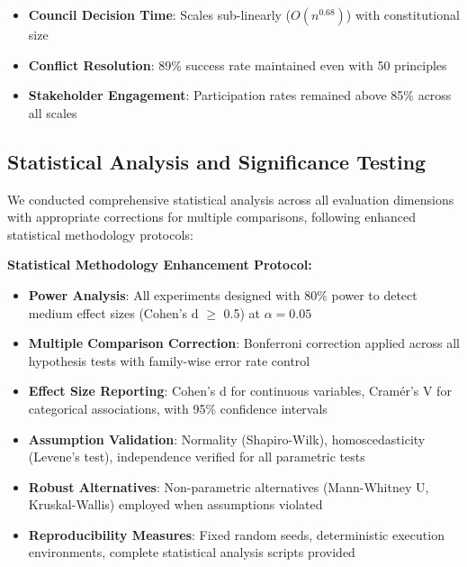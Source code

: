 \documentclass[sigconf,natbib]{acmart}
\begin{document}
\begin{itemize}
    \item \textbf{Council Decision Time}: Scales sub-linearly ($O(n^{0.68})$) with constitutional size
    \item \textbf{Conflict Resolution}: 89\% success rate maintained even with 50 principles
    \item \textbf{Stakeholder Engagement}: Participation rates remained above 85\% across all scales
\end{itemize}

\subsection{Statistical Analysis and Significance Testing}
\label{subsec:statistical_analysis}

We conducted comprehensive statistical analysis across all evaluation dimensions with appropriate corrections for multiple comparisons, following enhanced statistical methodology protocols:

\textbf{Statistical Methodology Enhancement Protocol:}
\begin{itemize}
    \item \textbf{Power Analysis}: All experiments designed with 80\% power to detect medium effect sizes (Cohen's d $\geq$ 0.5) at $\alpha = 0.05$
    \item \textbf{Multiple Comparison Correction}: Bonferroni correction applied across all hypothesis tests with family-wise error rate control
    \item \textbf{Effect Size Reporting}: Cohen's d for continuous variables, Cramér's V for categorical associations, with 95\% confidence intervals
    \item \textbf{Assumption Validation}: Normality (Shapiro-Wilk), homoscedasticity (Levene's test), independence verified for all parametric tests
    \item \textbf{Robust Alternatives}: Non-parametric alternatives (Mann-Whitney U, Kruskal-Wallis) employed when assumptions violated
    \item \textbf{Reproducibility Measures}: Fixed random seeds, deterministic execution environments, complete statistical analysis scripts provided
\end{itemize}
\end{document}
